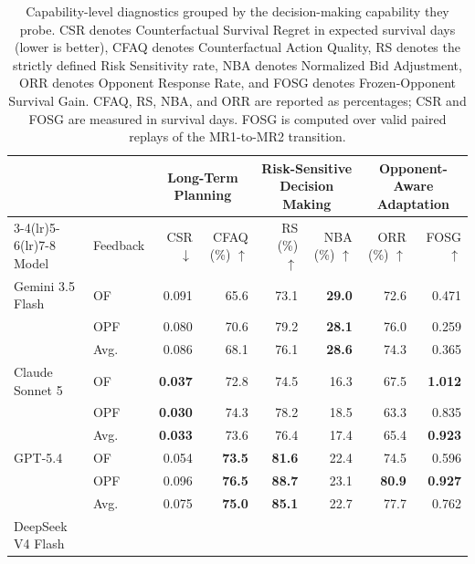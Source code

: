 \documentclass[letterpaper]{article} %
\begin{document}
\begin{table}[t]
    \centering
    \small
    \setlength{\tabcolsep}{3.5pt}
    \caption{Capability-level diagnostics grouped by the decision-making
    capability they probe. CSR denotes Counterfactual Survival Regret in
    expected survival days (lower is better), CFAQ denotes Counterfactual
    Action Quality, RS denotes the strictly defined Risk Sensitivity
    rate, NBA denotes Normalized Bid Adjustment, ORR denotes Opponent
    Response Rate, and FOSG denotes Frozen-Opponent Survival Gain.
    CFAQ, RS, NBA, and ORR are reported as percentages; CSR and FOSG
    are measured in survival days. FOSG is computed over valid paired
    replays of the MR1-to-MR2 transition.}
    \label{tab:capability-diagnostics}
    \begin{tabular}{llrrrrrr}
        \toprule
        & & \multicolumn{2}{c}{Long-Term Planning}
        & \multicolumn{2}{c}{Risk-Sensitive Decision Making}
        & \multicolumn{2}{c}{Opponent-Aware Adaptation} \\
        \cmidrule(lr){3-4}\cmidrule(lr){5-6}\cmidrule(lr){7-8}
        Model & Feedback & CSR $\downarrow$ & CFAQ (\%) $\uparrow$
        & RS (\%) $\uparrow$ & NBA (\%) $\uparrow$
        & ORR (\%) $\uparrow$ & FOSG $\uparrow$ \\
        \midrule
        Gemini 3.5 Flash
            & OF  & 0.091 & 65.6 & 73.1 & \textbf{29.0} & 72.6 & 0.471 \\
            & OPF & 0.080 & 70.6 & 79.2 & \textbf{28.1} & 76.0 & 0.259 \\
            & Avg. & 0.086 & 68.1 & 76.1 & \textbf{28.6} & 74.3 & 0.365 \\
        \addlinespace
        Claude Sonnet 5
            & OF  & \textbf{0.037} & 72.8 & 74.5 & 16.3 & 67.5 & \textbf{1.012} \\
            & OPF & \textbf{0.030} & 74.3 & 78.2 & 18.5 & 63.3 & 0.835 \\
            & Avg. & \textbf{0.033} & 73.6 & 76.4 & 17.4 & 65.4 & \textbf{0.923} \\
        \addlinespace
        GPT-5.4
            & OF  & 0.054 & \textbf{73.5} & \textbf{81.6} & 22.4 & 74.5 & 0.596 \\
            & OPF & 0.096 & \textbf{76.5} & \textbf{88.7} & 23.1 & \textbf{80.9} & \textbf{0.927} \\
            & Avg. & 0.075 & \textbf{75.0} & \textbf{85.1} & 22.7 & 77.7 & 0.762 \\
        \addlinespace
        DeepSeek V4 Flash

\end{tabular}
\end{table}
\end{document}
